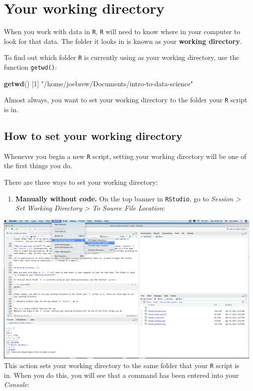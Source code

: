 \documentclass[]{book}
\newenvironment{Shaded}{\begin{snugshade}}{\end{snugshade}}
\newcommand{\DecValTok}[1]{\textcolor[rgb]{0.00,0.00,0.81}{#1}}
\newcommand{\KeywordTok}[1]{\textcolor[rgb]{0.13,0.29,0.53}{\textbf{#1}}}
\newcommand{\NormalTok}[1]{#1}
\newcommand{\StringTok}[1]{\textcolor[rgb]{0.31,0.60,0.02}{#1}}
\providecommand{\tightlist}{%
  \setlength{\itemsep}{0pt}\setlength{\parskip}{0pt}}
\begin{document}
\hypertarget{wd}{%
\section*{Your working directory}\label{wd}}

When you work with data in \texttt{R}, \texttt{R} will need to know where in your computer to look for that data. The folder it looks in is known as your \textbf{working directory}.

To find out which folder \texttt{R} is currently using as your working directory, use the function \texttt{getwd()}:

\begin{Shaded}
\begin{Highlighting}[]
\KeywordTok{getwd}\NormalTok{()}
\NormalTok{[}\DecValTok{1}\NormalTok{] }\StringTok{"/home/joebrew/Documents/intro-to-data-science"}
\end{Highlighting}
\end{Shaded}

Almost always, you want to set your working directory to the folder your \texttt{R} script is in.

\hypertarget{how-to-set-your-working-directory}{%
\subsection*{How to set your working directory}\label{how-to-set-your-working-directory}}

Whenever you begin a new \texttt{R} script, setting your working directory will be one of the first things you do.

There are three ways to set your working directory:

\begin{enumerate}
\def\labelenumi{\arabic{enumi}.}
\tightlist
\item
  \textbf{Manually without code.} On the top banner in \texttt{RStudio}, go to \emph{Session \textgreater{} Set Working Directory \textgreater{} To Source File Location}:
\end{enumerate}

\includegraphics{img/rstudio_setwd.png}
This action sets your working directory to the same folder that your \texttt{R} script is in. When you do this, you will see that a command has been entered into your \emph{Console}:
\end{document}
